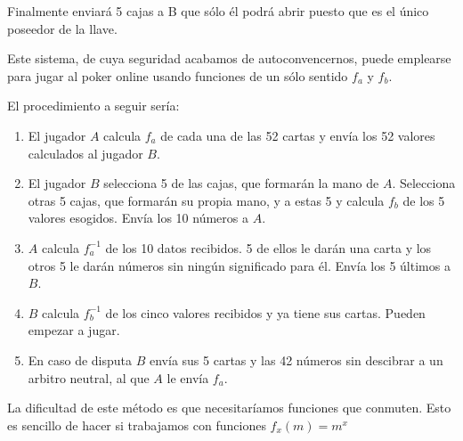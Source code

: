 \begin{problem}[1]
Finalmente enviará 5 cajas a B que sólo él podrá abrir puesto que es el único poseedor de la llave.

Este sistema, de cuya seguridad acabamos de autoconvencernos, puede emplearse para jugar al poker online usando funciones de un sólo sentido $f_a$ y $f_b$.

El procedimiento a seguir sería:

\begin{enumerate}
\item El jugador $A$ calcula $f_a$ de cada una de las 52 cartas y envía los 52 valores calculados al jugador $B$.

\item El jugador $B$ selecciona 5 de las cajas, que formarán la mano
de $A$. Selecciona otras 5 cajas, que formarán su propia mano, y a
estas 5 y calcula $f_b$ de los 5 valores esogidos. Envía los 10 números a $A$.

\item $A$ calcula $f^{-1}_a$ de los 10 datos recibidos. 5 de ellos le darán una carta y los otros 5 le darán números sin ningún significado para él. Envía los 5 últimos a $B$.

\item $B$ calcula $f^{-1}_b$ de los cinco valores recibidos y ya tiene sus cartas. Pueden empezar a jugar.

\item En caso de disputa $B$ envía sus 5 cartas y las 42 números sin descibrar a un arbitro neutral, al que $A$ le envía $f_a$.
\end{enumerate}

La dificultad de este método es que necesitaríamos funciones que conmuten. Esto es sencillo de hacer si trabajamos con funciones $f_x(m)=m^x$
\end{problem}

